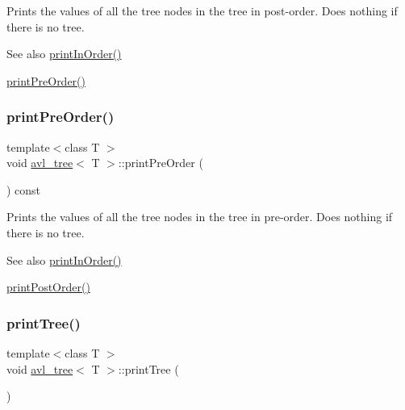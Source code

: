 Prints the values of all the tree nodes in the tree in post-\/order. Does nothing if there is no tree. \begin{DoxySeeAlso}{See also}
\hyperlink{classavl__tree_a524ae6ac5d7f7c2399fb758aba84af80}{print\+In\+Order()} 

\hyperlink{classavl__tree_ac17fa1e4aa2f0f4b609a7b72c34bd2f6}{print\+Pre\+Order()} 
\end{DoxySeeAlso}
\mbox{\label{classavl__tree_ac17fa1e4aa2f0f4b609a7b72c34bd2f6}} 
\subsubsection{\texorpdfstring{print\+Pre\+Order()}{printPreOrder()}}
{\footnotesize\ttfamily template$<$class T $>$ \\
void \hyperlink{classavl__tree}{avl\+\_\+tree}$<$ T $>$\+::print\+Pre\+Order (\begin{DoxyParamCaption}{ }\end{DoxyParamCaption}) const\hspace{0.3cm}{\ttfamily [inline]}}

Prints the values of all the tree nodes in the tree in pre-\/order. Does nothing if there is no tree. \begin{DoxySeeAlso}{See also}
\hyperlink{classavl__tree_a524ae6ac5d7f7c2399fb758aba84af80}{print\+In\+Order()} 

\hyperlink{classavl__tree_a5fb83061648947aeb6b540a5dee7ae13}{print\+Post\+Order()} 
\end{DoxySeeAlso}
\mbox{\label{classavl__tree_ae067ad48ed35e1df18fdda1ed83c3d79}} 
\subsubsection{\texorpdfstring{print\+Tree()}{printTree()}}
{\footnotesize\ttfamily template$<$class T $>$ \\
void \hyperlink{classavl__tree}{avl\+\_\+tree}$<$ T $>$\+::print\+Tree (\begin{DoxyParamCaption}{ }\end{DoxyParamCaption})\hspace{0.3cm}{\ttfamily [inline]}}


